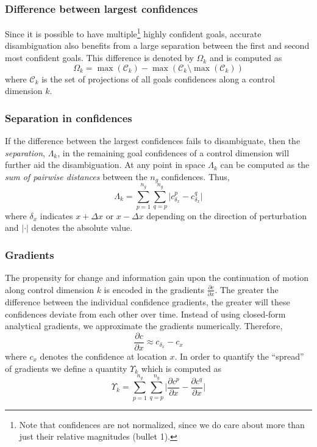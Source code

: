\documentclass[conference]{IEEEtran}
\begin{document}
\subsubsection{Difference between largest confidences}
Since it is possible to have multiple\footnote{Note that confidences are not normalized, since we do care about more than just their relative magnitudes (bullet 1).} highly confident goals, accurate disambiguation also benefits from a large separation between the first and second most confident goals. 
This difference is denoted by $\Omega_k$ and is computed as
\begin{equation*}
\Omega_k = \max(\mathcal{C}_k) - \max(\mathcal{C}_k \setminus {\max(\mathcal{C}_k)})
\end{equation*}
where $\mathcal{C}_k$ is the set of projections of all goals confidences along a control dimension $k$.
\subsubsection{Separation in confidences}
If the difference between the largest confidences fails to disambiguate, then the \textit{separation}, $\Lambda_k$, in the remaining goal confidences of a control dimension will further aid the disambiguation. At any point in space $\Lambda_k$ can be computed as the \textit{sum of pairwise distances} between the $n_g$ confidences.  Thus,
\begin{equation*}
\Lambda_k = \sum_{p=1}^{n_g}\sum_{q=p}^{n_g}\lvert c^{p}_{\delta_x} - c^{q}_{\delta_x}\rvert
\end{equation*}
where $\delta_x$ indicates $x+\Delta x$ or $x-\Delta x$ depending on the direction of perturbation and $\lvert\cdot\rvert$ denotes the absolute value.
\subsubsection{Gradients}\label{COMP4}
The propensity for change and information gain upon the continuation of motion along control dimension $k$ is encoded in the gradients $\frac{\partial c}{\partial x}$. The greater the difference between the individual confidence gradients, the greater will these confidences deviate from each other over time.  Instead of using closed-form analytical gradients, we approximate the gradients numerically. Therefore, 
\begin{equation*}
\frac{\partial c}{\partial x} \approx c_{\delta_x} - c_{x} 
\end{equation*}
where $c_x$ denotes the confidence at location $x$.
In order to quantify the ``spread'' of gradients we define a quantity $\Upsilon_k$ which is computed as 
\begin{equation*}
\Upsilon_k = \sum_{p=1}^{n_g}\sum_{q=p}^{n_g}\Big \lvert\frac{\partial c^p}{\partial x} - \frac{\partial c^q}{\partial x}\Big \rvert
\end{equation*}
\end{document}
